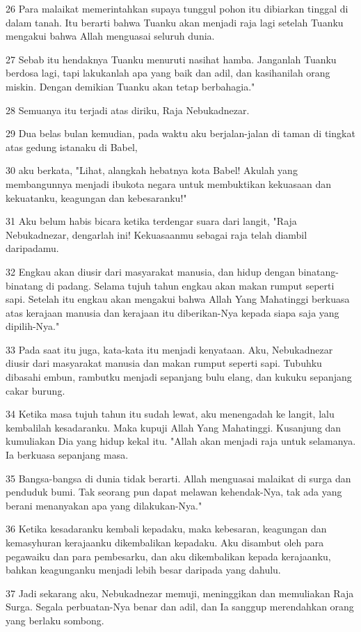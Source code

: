 \par 26 Para malaikat memerintahkan supaya tunggul pohon itu dibiarkan tinggal di dalam tanah. Itu berarti bahwa Tuanku akan menjadi raja lagi setelah Tuanku mengakui bahwa Allah menguasai seluruh dunia.
\par 27 Sebab itu hendaknya Tuanku menuruti nasihat hamba. Janganlah Tuanku berdosa lagi, tapi lakukanlah apa yang baik dan adil, dan kasihanilah orang miskin. Dengan demikian Tuanku akan tetap berbahagia."
\par 28 Semuanya itu terjadi atas diriku, Raja Nebukadnezar.
\par 29 Dua belas bulan kemudian, pada waktu aku berjalan-jalan di taman di tingkat atas gedung istanaku di Babel,
\par 30 aku berkata, "Lihat, alangkah hebatnya kota Babel! Akulah yang membangunnya menjadi ibukota negara untuk membuktikan kekuasaan dan kekuatanku, keagungan dan kebesaranku!"
\par 31 Aku belum habis bicara ketika terdengar suara dari langit, "Raja Nebukadnezar, dengarlah ini! Kekuasaanmu sebagai raja telah diambil daripadamu.
\par 32 Engkau akan diusir dari masyarakat manusia, dan hidup dengan binatang-binatang di padang. Selama tujuh tahun engkau akan makan rumput seperti sapi. Setelah itu engkau akan mengakui bahwa Allah Yang Mahatinggi berkuasa atas kerajaan manusia dan kerajaan itu diberikan-Nya kepada siapa saja yang dipilih-Nya."
\par 33 Pada saat itu juga, kata-kata itu menjadi kenyataan. Aku, Nebukadnezar diusir dari masyarakat manusia dan makan rumput seperti sapi. Tubuhku dibasahi embun, rambutku menjadi sepanjang bulu elang, dan kukuku sepanjang cakar burung.
\par 34 Ketika masa tujuh tahun itu sudah lewat, aku menengadah ke langit, lalu kembalilah kesadaranku. Maka kupuji Allah Yang Mahatinggi. Kusanjung dan kumuliakan Dia yang hidup kekal itu. "Allah akan menjadi raja untuk selamanya. Ia berkuasa sepanjang masa.
\par 35 Bangsa-bangsa di dunia tidak berarti. Allah menguasai malaikat di surga dan penduduk bumi. Tak seorang pun dapat melawan kehendak-Nya, tak ada yang berani menanyakan apa yang dilakukan-Nya."
\par 36 Ketika kesadaranku kembali kepadaku, maka kebesaran, keagungan dan kemasyhuran kerajaanku dikembalikan kepadaku. Aku disambut oleh para pegawaiku dan para pembesarku, dan aku dikembalikan kepada kerajaanku, bahkan keagunganku menjadi lebih besar daripada yang dahulu.
\par 37 Jadi sekarang aku, Nebukadnezar memuji, meninggikan dan memuliakan Raja Surga. Segala perbuatan-Nya benar dan adil, dan Ia sanggup merendahkan orang yang berlaku sombong.

